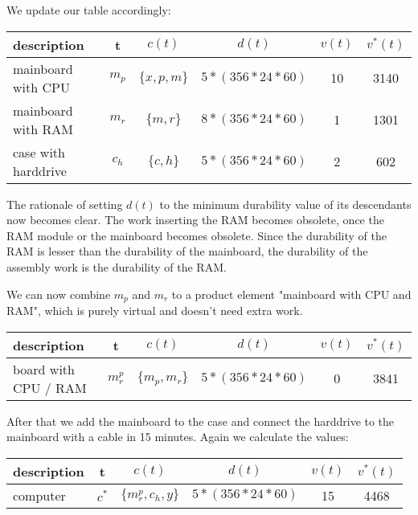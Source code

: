 \documentclass[11pt]{article}
\begin{document}
We update our table accordingly:


\begin{center}
  \begin{tabular}{ l | c | c | c | c | c }
    \hline
    description & t & $c(t)$ & $d(t)$ & $v(t)$ & $v^*(t)$ \\ \hline
    mainboard with CPU & $m_{p}$ & $\{x, p, m\}$ & $5*(356*24*60)$ & 10 & 3140\\ \hline
    mainboard with RAM & $m_{r}$ & $\{m, r\}$ & $8*(356*24*60)$ & 1 & 1301
    \\ \hline
    case with harddrive & $c_{h}$ & $\{c, h\}$ & $5*(356*24*60)$ & 2 & 602
    \\ \hline
    \hline
  \end{tabular}
\end{center}

The rationale of setting $d(t)$ to the minimum durability value of its descendants now becomes clear. The work inserting the RAM becomes obsolete, once the RAM module or the mainboard becomes obsolete. Since the durability of the RAM is lesser than the durability of the mainboard, the durability of the assembly work is the durability of the RAM. 

We can now combine $m_p$ and $m_r$ to a product element "mainboard with CPU and RAM", which is purely virtual and doesn't need extra work.

\begin{center}
  \begin{tabular}{ l | c | c | c | c | c }
    \hline
    description & t & $c(t)$ & $d(t)$ & $v(t)$ & $v^*(t)$ \\ \hline
    board with CPU / RAM& $m_{r}^{p}$ & $\{m_{p}, m_{r}\}$ & $5*(356*24*60)$ & 0 & 3841  \end{tabular}
\end{center}

After that we add the mainboard to the case and connect the harddrive to the mainboard with a cable in 15 minutes. Again we calculate the values:

\begin{center}
  \begin{tabular}{ l | c | c | c | c | c }
    \hline
    description & t & $c(t)$ & $d(t)$ & $v(t)$ & $v^*(t)$ \\ \hline
    computer & $c^*$ & $\{m^{p}_{r}, c_{h}, y\}$ & $5*(356*24*60)$ & 15 & 4468  \end{tabular}
\end{center}
\end{document}
